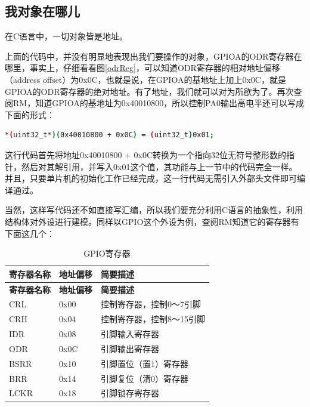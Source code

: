\subsection{我对象在哪儿}
在C语言中，一切对象皆是地址。
\par 
上面的代码中，并没有明显地表现出我们要操作的对象，GPIOA的ODR寄存器在哪里，事实上，仔细看看图\ref{odrReg}，可以知道ODR寄存器的相对地址偏移（address offset）为0x0C，也就是说，在GPIOA的基地址上加上0x0C，就是GPIOA的ODR寄存器的绝对地址。有了地址，我们就可以对为所欲为了。再次查阅\acs{RM}，知道GPIOA的基地址为0x40010800，所以控制PA0输出高电平还可以写成下面的形式：
\par 
\begin{lstlisting}[language=bash, style=customStyleC, caption=控制PA0输出高电平]
*(uint32_t*)(0x40010800 + 0x0C) = (uint32_t)0x01;
\end{lstlisting}
\par 
这行代码首先将地址0x40010800 + 0x0C转换为一个指向32位无符号整形数的指针，然后对其解引用，并写入0x01这个值，其功能与上一节中的代码完全一样。并且，只要单片机的初始化工作已经完成，这一行代码无需引入外部头文件即可编译通过。
\par 
当然，这样写代码还不如直接写汇编，所以我们要充分利用C语言的抽象性，利用结构体对外设进行建模。同样以GPIO这个外设为例，查阅\acs{RM}知道它的寄存器有下面这几个：
\begin{center}
	\begin{longtable}[l]{| p{30mm} | p{30mm} | p{80mm} |}
		\caption{GPIO寄存器}\\
		\hline 
		\rowcolor{Gray}
		\textbf{寄存器名称} & \textbf{地址偏移} & \textbf{简要描述} \\
		\hline
		\endfirsthead
		
		\hline 
		\rowcolor{Gray}
		\textbf{寄存器名称} & \textbf{地址偏移} & \textbf{简要描述} \\
		\hline
		\endhead
		
		CRL & 0x00 & 控制寄存器，控制0～7引脚 \\
		CRH & 0x04 & 控制寄存器，控制8～15引脚 \\
		IDR & 0x08 & 引脚输入寄存器 \\
		ODR & 0x0C & 引脚输出寄存器 \\
		BSRR & 0x10 & 引脚置位（置1）寄存器 \\
		BRR & 0x14 & 引脚复位（清0）寄存器 \\
		LCKR & 0x18 & 引脚锁存寄存器 \\
		
		\hline
	\end{longtable}
\end{center}
